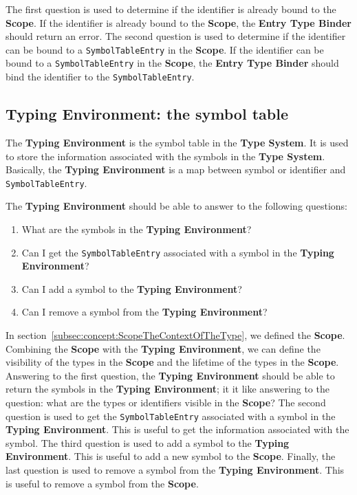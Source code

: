 The first question is used to determine if the identifier is already bound to the \textbf{Scope}. If the identifier is already bound to the \textbf{Scope}, the \textbf{Entry Type Binder} should return an error.
The second question is used to determine if the identifier can be bound to a \texttt{SymbolTableEntry} in the \textbf{Scope}. If the identifier can be bound to a \texttt{SymbolTableEntry} in the \textbf{Scope}, the \textbf{Entry Type Binder} should bind the identifier to the \texttt{SymbolTableEntry}.

\subsection{Typing Environment: the symbol table}\label{subsec:concept:TypingEnvironmentTheSymbolTable}

The \textbf{Typing Environment} is the symbol table in the \textbf{Type System}. It is used to store the information associated with the symbols in the \textbf{Type System}.
Basically, the \textbf{Typing Environment} is a map between symbol or identifier and \texttt{SymbolTableEntry}.

The \textbf{Typing Environment} should be able to answer to the following questions:
\begin{enumerate}
    \item What are the symbols in the \textbf{Typing Environment}?
    \item Can I get the \texttt{SymbolTableEntry} associated with a symbol in the \textbf{Typing Environment}?
    \item Can I add a symbol to the \textbf{Typing Environment}?
    \item Can I remove a symbol from the \textbf{Typing Environment}?
\end{enumerate}

In section~\ref{subsec:concept:ScopeTheContextOfTheType}, we defined the \textbf{Scope}. Combining the \textbf{Scope} with the \textbf{Typing Environment}, we can define the visibility of the types in the \textbf{Scope} and the lifetime of the types in the \textbf{Scope}.
Answering to the first question, the \textbf{Typing Environment} should be able to return the symbols in the \textbf{Typing Environment}; it it like answering to the question: what are the types or identifiers visible in the \textbf{Scope}?
The second question is used to get the \texttt{SymbolTableEntry} associated with a symbol in the \textbf{Typing Environment}. This is useful to get the information associated with the symbol.
The third question is used to add a symbol to the \textbf{Typing Environment}. This is useful to add a new symbol to the \textbf{Scope}.
Finally, the last question is used to remove a symbol from the \textbf{Typing Environment}. This is useful to remove a symbol from the \textbf{Scope}.

